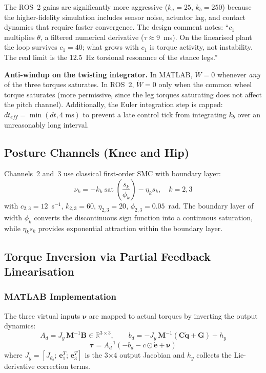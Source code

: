 \documentclass[11pt,a4paper]{article}
\newcommand{\bdq}{\dot{\bm{q}}}
\newcommand{\btau}{\bm{\tau}}
\newcommand{\bM}{\bm{M}}
\newcommand{\bC}{\bm{C}}
\newcommand{\bG}{\bm{G}}
\newcommand{\bB}{\bm{B}}
\newcommand{\Real}{\mathbb{R}}
\begin{document}
The ROS~2 gains are significantly more aggressive ($k_a = 25$, $k_b = 250$) because the
higher-fidelity simulation includes sensor noise, actuator lag, and contact dynamics that
require faster convergence.  The design comment notes: ``$c_1$ multiplies $\dot\theta$, a
filtered numerical derivative ($\tau \approx 9$~ms).  On the linearised plant the loop
survives $c_1 = 40$; what grows with $c_1$ is torque activity, not instability.  The real
limit is the 12.5~Hz torsional resonance of the stance legs.''

\textbf{Anti-windup on the twisting integrator.}  In MATLAB, $\dot{W} = 0$ whenever
\emph{any} of the three torques saturates.  In ROS~2, $\dot{W} = 0$ only when the common
wheel torque saturates (more permissive, since the leg torques saturating does not affect
the pitch channel).  Additionally, the Euler integration step is capped:
$dt_{eff} = \min(dt, 4\text{~ms})$ to prevent a late control tick from integrating $k_b$
over an unreasonably long interval.

\subsection{Posture Channels (Knee and Hip)}

Channels~2 and~3 use classical first-order SMC with boundary layer:
\begin{equation}
    \nu_k = -k_k\operatorname{sat}\!\left(\frac{s_k}{\phi_k}\right) - \eta_k s_k,
    \quad k = 2,3
\end{equation}
with $c_{2,3} = 12$~s$^{-1}$, $k_{2,3} = 60$, $\eta_{2,3} = 20$,
$\phi_{2,3} = 0.05$~rad.  The boundary layer of width $\phi_k$ converts the discontinuous
sign function into a continuous saturation, while $\eta_k s_k$ provides exponential
attraction within the boundary layer.

\subsection{Torque Inversion via Partial Feedback Linearisation}

\subsubsection{MATLAB Implementation}

The three virtual inputs $\bm{\nu}$ are mapped to actual torques by inverting the
output dynamics:
\begin{equation}
    A_d = J_y\,\bM^{-1}\bB \in \Real^{3\times3}, \qquad
    b_d = -J_y\,\bM^{-1}(\bC\bdq + \bG) + h_y
\end{equation}
\begin{equation}
    \btau = A_d^{-1}(-b_d - c \odot \dot{\bm{e}} + \bm{\nu})
\end{equation}
where $J_y = [J_{\theta_b};\,\bm{e}_1^T;\,\bm{e}_3^T]$ is the 3$\times$4 output Jacobian
and $h_y$ collects the Lie-derivative correction terms.
\end{document}
